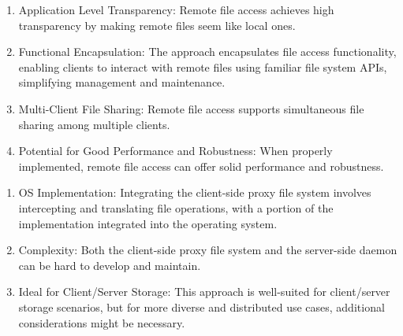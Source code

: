 \documentclass{report}
\begin{document}
\begin{tcbraster}[raster columns=2, raster equal height, raster force size=false]
  \begin{tcolorbox}[colback=green!5!white,colframe=black!75!green,title=Advantages]
    \begin{enumerate}[label=\textit{(\roman*)}]
    \item Application Level Transparency: Remote file access achieves high transparency by making
      remote files seem like local ones.
    \item Functional Encapsulation: The approach encapsulates file access functionality, enabling
      clients to interact with remote files using familiar file system APIs, simplifying management and
      maintenance.
    \item Multi-Client File Sharing: Remote file access supports simultaneous file sharing among
      multiple clients.
    \item Potential for Good Performance and Robustness: When properly implemented, remote file
      access can offer solid performance and robustness.
    \end{enumerate}
  \end{tcolorbox}
  \begin{tcolorbox}[colback=red!5!white,colframe=black!40!red,title=Disadvantages]
    \begin{enumerate}[label=\textit{(\roman*)}]
    \item OS Implementation: Integrating the client-side proxy file system involves intercepting
      and translating file operations, with a portion of the implementation integrated into the operating
      system.
    \item Complexity: Both the client-side proxy file system and the server-side daemon can be
      hard to develop and maintain.
    \item Ideal for Client/Server Storage: This approach is well-suited for client/server storage
      scenarios, but for more diverse and distributed use cases, additional considerations might be
      necessary.
    \end{enumerate}
  \end{tcolorbox}
\end{tcbraster}
\end{document}
